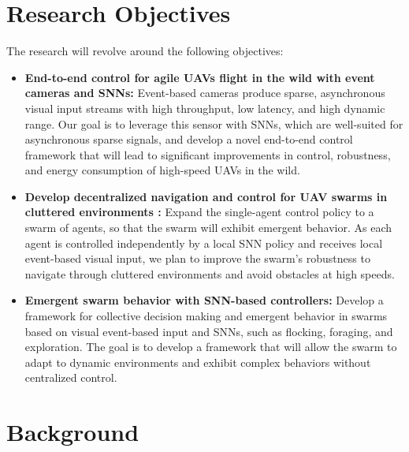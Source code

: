 \documentclass{article}
\begin{document}
\section{Research Objectives}
The research will revolve around the following objectives:    
\begin{itemize}
    \item \textbf{End-to-end control for agile UAVs flight in the wild with event cameras and SNNs:}
    Event-based cameras produce sparse, asynchronous visual input streams with high throughput, low latency, and high dynamic range. Our goal is to leverage this sensor with SNNs, which are well-suited for asynchronous sparse signals, and develop a novel end-to-end control framework that will lead to significant improvements in control, robustness, and energy consumption of high-speed UAVs in the wild.
          
    \item \textbf{Develop decentralized navigation and control for UAV swarms in cluttered environments :} 
    Expand the single-agent control policy to a swarm of agents, so that the swarm will exhibit emergent behavior. As each agent is controlled independently by a local SNN policy and receives local event-based visual input, we plan to improve the swarm's robustness to navigate through cluttered environments and avoid obstacles at high speeds.
            
    \item \textbf{Emergent swarm behavior with SNN-based controllers:}
    Develop a framework for collective decision making and emergent behavior in swarms based on visual event-based input and SNNs, such as flocking, foraging, and exploration. The goal is to develop a framework that will allow the swarm to adapt to dynamic environments and exhibit complex behaviors without centralized control.
\end{itemize}

\section{Background}
\end{document}
